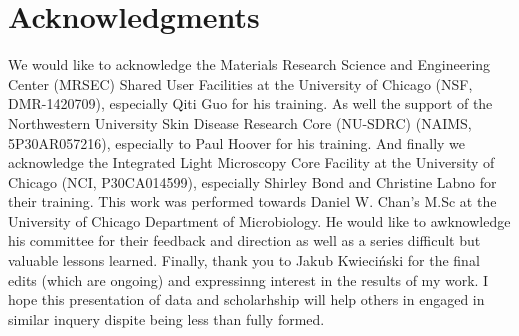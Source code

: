 \documentclass[10pt,letterpaper]{article}
\begin{document}
\newpage

\section*{Acknowledgments}
We would like to acknowledge the Materials Research Science and Engineering Center (MRSEC) Shared User Facilities at the University of Chicago (NSF, DMR-1420709), especially Qiti Guo for his training.
As well the support of the Northwestern University Skin Disease Research Core (NU-SDRC) (NAIMS, 5P30AR057216), especially to Paul Hoover for his training.
And finally we acknowledge the Integrated Light Microscopy Core Facility at the University of Chicago (NCI, P30CA014599), especially Shirley Bond and Christine Labno for their training.
This work was performed towards Daniel W. Chan's M.Sc at the University of Chicago Department of Microbiology.
He would like to awknowledge his committee for their feedback and direction as well as a series difficult but valuable lessons learned.
Finally, thank you to Jakub Kwieciński for the final edits (which are ongoing) and expressinng interest in the results of my work.
I hope this presentation of data and scholarhship will help others in engaged in similar inquery dispite being less than fully formed.

%
%
% 

\nolinenumbers



%
%
% 
\end{document}
